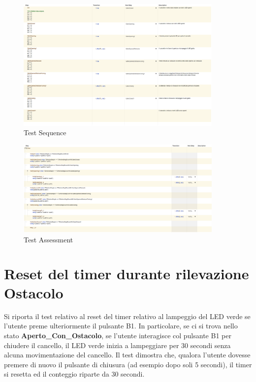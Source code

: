         \begin{figure}[H]
            \centering
            \includegraphics[width=0.9\textwidth]{figures/tuningOB.png}
            \caption{Test Sequence}
            \label{tuningob}
        \end{figure}
        
        \begin{figure}[H]
            \centering
            \includegraphics[width=0.9\textwidth]{figures/tuningOB1.png}
            \caption{Test Assessment}
            \label{tuningob1}
        \end{figure}


    \section{Reset del timer durante rilevazione Ostacolo}
    Si riporta il test relativo al reset del timer relativo al lampeggio del LED verde se l'utente preme ulteriormente il pulsante B1. In particolare, se ci si trova nello stato \textbf{Aperto\_Con\_Ostacolo}, se l'utente interagisce col pulsante B1 per chiudere il cancello, il LED verde inizia a lampeggiare per 30 secondi senza alcuna movimentazione del cancello. Il test dimostra che, qualora l'utente dovesse premere di nuovo il pulsante di chiusura (ad esempio dopo soli 5 secondi), il timer si resetta ed il conteggio riparte da 30 secondi.

